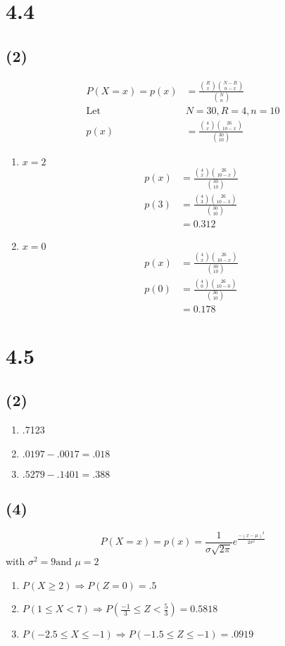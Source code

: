 \documentclass[12pt]{report}
\begin{document}
\section*{4.4}
   \subsection*{{\bf (2)}}
    \begin{align*}
      P(X=x)=p(x)&=\frac{\binom{R}{x}  \binom{N-R}{n-x}}{\binom{N}{n}}\\
      \text{Let }& N=30,R=4,n=10\\
      p(x)&=\frac{\binom{4}{x}  \binom{26}{10-x}}{\binom{30}{10}}
   \end{align*}
 \begin{enumerate}[label={\bf \alph*}]
 \item $x= 2$
     \begin{align*}
         p(x)&=\frac{\binom{4}{x}  \binom{26}{10-x}}{\binom{30}{10}}\\
         p(3)&=\frac{\binom{4}{3}  \binom{26}{10-3}}{\binom{30}{10}}\\
             &= 0.312
      \end{align*}
   \item$x= 0$
     \begin{align*}
         p(x)&=\frac{\binom{4}{x}  \binom{26}{10-x}}{\binom{30}{10}}\\
         p(0)&=\frac{\binom{4}{0}  \binom{26}{10-0}}{\binom{30}{10}}\\
             &=  0.178
      \end{align*}
 \end{enumerate}  
\section*{4.5}
      \subsection*{{\bf (2)}}
       \begin{enumerate}[label={\bf \alph*}]
      \item .7123
      \item  $.0197-.0017=.018$
      \item  $.5279-.1401=.388 $
       \end{enumerate}  
      \subsection*{{\bf (4)}}
      $$P(X=x)=p(x)=\frac{1}{\sigma\sqrt{2\pi}}e^{\frac{-(x-\mu)^2}{2\sigma^2}}$$
      with $\sigma^2=9 \text{and }\mu=2$
      \begin{enumerate}[label={\bf \alph*}]
      \item $P(X\geq2) \Rightarrow P(Z=0)=.5$
      \item$P(1\leq X < 7) \Rightarrow P(\frac{-1}{3} \leq Z <\frac{5}{3})=0.5818$
      \item $P(-2.5\leq X \leq -1)\Rightarrow P(-1.5 \leq Z \leq -1)=.0919$
      \end{enumerate}  
\end{document}
